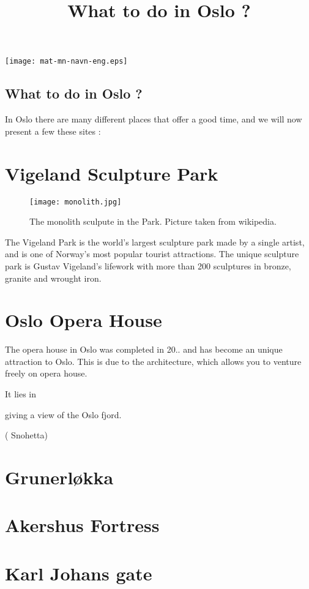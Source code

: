 \documentclass{article}
\title{What to do in Oslo ? }
\begin{document}
\texttt{[image: mat-mn-navn-eng.eps]} 


\begin{center}
\section*{What to do in Oslo ?}
In Oslo there are many different places that offer a good time, and we will now present a few these sites : 


\end{center}


\section*{Vigeland Sculpture Park} 
\begin{wrapfigure}[]{r}{0.5\textwidth}
    \centering
    \texttt{[image: monolith.jpg]}%
     \caption{The monolith sculpute in the Park. Picture taken from wikipedia. }
\end{wrapfigure}

The Vigeland Park is the world's largest sculpture park made by a single artist, and is one of Norway's most popular tourist attractions. The unique sculpture park is Gustav Vigeland's lifework with more than 200 sculptures in bronze, granite and wrought iron. 






\section*{Oslo Opera House}
The opera house in Oslo was completed in 20.. and has become an unique attraction to Oslo. This is due to the architecture, which allows you to venture freely on opera house.


It lies in 


giving a view of the Oslo fjord. 


( Snohetta)



\section*{Grunerløkka}



\section*{Akershus Fortress}


\section*{Karl Johans gate}
\end{document}
